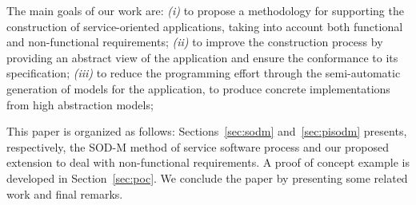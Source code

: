 The main goals of our work are:
\textit{(i)} to propose a methodology for supporting the construction of service-oriented applications, taking into account both functional and non-functional requirements;
\textit{(ii)} to improve the construction process by providing an abstract view of the application and ensure the conformance to its specification;
\textit{(iii)} to reduce the programming effort through the semi-automatic generation of  models for the application, to produce concrete implementations from high abstraction models;


\bigskip
This paper is organized as follows:
Sections~\ref{sec:sodm} and~\ref{sec:pisodm} presents, respectively, the SOD-M method of service software process and our proposed extension to deal with non-functional requirements.
A proof of concept example is developed in Section~\ref{sec:poc}.
We conclude the paper by presenting some related work and final remarks.
